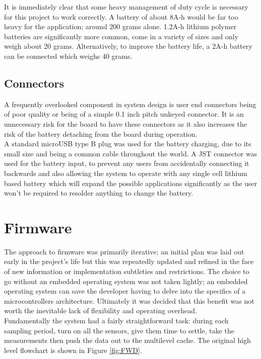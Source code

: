 \documentclass[12pt,openany,a4paper]{book}
\begin{document}
		It is immediately clear that some heavy management of duty cycle is necessary for this project to work correctly. A battery of about 8A-h would be far too heavy for the application; around 200 grams alone. 1.2A-h lithium polymer batteries are significantly more common, come in a variety of sizes and only weigh about 20 grams. Alternatively, to improve the battery life, a 2A-h battery can be connected which weighs 40 grams.
		
		\subsection{Connectors}
		A frequently overlooked component in system design is user end connectors being of poor quality or being of a simple 0.1 inch pitch unkeyed connector. It is an unnecessary risk for the board to have these connectors as it also increases the risk of the battery detaching from the board during operation.\\
		
		A standard microUSB type B plug was used for the battery charging, due to its small size and being a common cable throughout the world. A JST connector was used for the battery input, to prevent any users from accidentally connecting it backwards and also allowing the system to operate with any single cell lithium based battery which will expand the possible applications significantly as the user won't be required to resolder anything to change the battery. 
		
	\newpage
	\section{Firmware}
		The approach to firmware was primarily iterative; an initial plan was laid out early in the project's life but this was repeatedly updated and refined in the face of new information or implementation subtleties and restrictions. The choice to go without an embedded operating system was not taken lightly; an embedded operating system can save the developer having to delve into the specifics of a microcontrollers architecture. Ultimately it was decided that this benefit was not worth the inevitable lack of flexibility and operating overhead. \\
		
		Fundamentally the system had a fairly straightforward task: during each sampling period, turn on all the sensors, give them time to settle, take the measurements then push the data out to the multilevel cache. The original high level flowchart is shown in Figure \ref{fig:FWD}.
		
\end{document}
